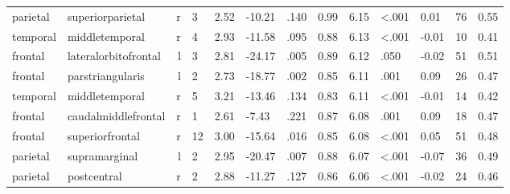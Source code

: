 \documentclass{article}
\begin{document}
\begin{longtable}{llrR{1.3cm}R{1cm}R{1.3cm}R{1cm}R{1cm}R{1.3cm}R{1cm}R{1.8cm}R{1.3cm}R{1.8cm}}
  parietal &          superiorparietal &    r &         3 &                  2.52 &           -10.21 &               .140 &                               0.99 &                          6.15 &                   \textless.001 &   0.01 &     76 &      0.55 \\
  temporal &            middletemporal &    r &         4 &                  2.93 &           -11.58 &               .095 &                               0.88 &                          6.13 &                   \textless.001 &  -0.01 &     10 &      0.41 \\
   frontal &      lateralorbitofrontal &    l &         3 &                  2.81 &           -24.17 &               .005 &                               0.89 &                          6.12 &                            .050 &  -0.02 &     51 &      0.51 \\
   frontal &          parstriangularis &    l &         2 &                  2.73 &           -18.77 &               .002 &                               0.85 &                          6.11 &                            .001 &   0.09 &     26 &      0.47 \\
  temporal &            middletemporal &    r &         5 &                  3.21 &           -13.46 &               .134 &                               0.83 &                          6.11 &                   \textless.001 &  -0.01 &     14 &      0.42 \\
   frontal &       caudalmiddlefrontal &    r &         1 &                  2.61 &            -7.43 &               .221 &                               0.87 &                          6.08 &                            .001 &   0.09 &     18 &      0.47 \\
   frontal &           superiorfrontal &    r &        12 &                  3.00 &           -15.64 &               .016 &                               0.85 &                          6.08 &                   \textless.001 &   0.05 &     51 &      0.48 \\
  parietal &             supramarginal &    l &         2 &                  2.95 &           -20.47 &               .007 &                               0.88 &                          6.07 &                   \textless.001 &  -0.07 &     36 &      0.49 \\
  parietal &               postcentral &    r &         2 &                  2.88 &           -11.27 &               .127 &                               0.86 &                          6.06 &                   \textless.001 &  -0.02 &     24 &      0.46 \\

\end{longtable}
\end{document}
